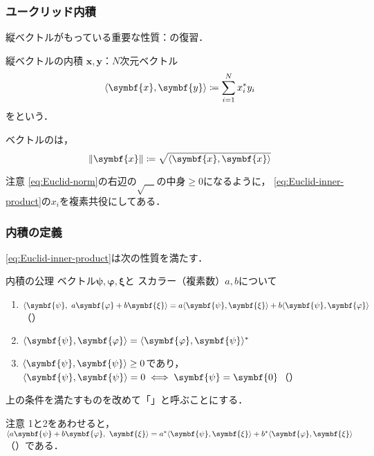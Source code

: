 \documentclass[
    10pt,
    ]{sotsu-beamer}
\begin{document}
\begin{frame}
    \frametitle{ユークリッド内積}

    縦ベクトルがもっている重要な性質：の復習．

    \begin{block}{縦ベクトルの内積}
        $\symbf{x}, \symbf{y}$：$N$次元ベクトル
        \begin{equation}
            \label{eq:Euclid-inner-product}
            \iparen{\symbf{x}, \symbf{y}}
                \coloneq \sum_{i=1}^{N} x_i^* y_i
        \end{equation}
        をという．
    \end{block}

    ベクトルのは，
    \begin{equation}
        \label{eq:Euclid-norm}
        \norm{\symbf{x}} \coloneq \sqrt{\iparen{\symbf{x}, \symbf{x}}}
    \end{equation}

    \begin{alertblock}{注意}
        \eqref{eq:Euclid-norm}の右辺の$\sqrt{\quad}$の中身$\geq 0$になるように，
        \eqref{eq:Euclid-inner-product}の$x_i$を複素共役にしてある．
    \end{alertblock}

\end{frame}

\begin{frame}
    \frametitle{内積の定義}

    \eqref{eq:Euclid-inner-product}は次の性質を満たす．

    \begin{block}{内積の公理}
        ベクトル$\symbf{\psi}, \symbf{\varphi}, \symbf{\xi}$と
        スカラー（複素数）$a, b$について
        \begin{enumerate}
            \item $\iparen{\symbf{\psi}, \  a\symbf{\varphi} + b\symbf{\xi}} = a\iparen{\symbf{\psi}, \symbf{\xi}} + b\iparen{\symbf{\psi}, \symbf{\varphi}}$（）
            \item $\iparen{\symbf{\psi}, \symbf{\varphi}} = \conj{\iparen{\symbf{\varphi}, \symbf{\psi}}}$
            \item $\iparen{\symbf{\psi}, \symbf{\psi}} \geq 0$であり，
                $\iparen{\symbf{\psi}, \symbf{\psi}} = 0 \iff \symbf{\psi} = \symbf{0}$（）
        \end{enumerate}
    \end{block}

    上の条件を満たすものを改めて「」と呼ぶことにする．

    \begin{alertblock}{注意}
        1と2をあわせると，
        $\iparen{a\symbf{\psi} + b\symbf{\varphi}, \  \symbf{\xi}} = \conj{a}\iparen{\symbf{\psi}, \symbf{\xi}} + \conj{b}\iparen{\symbf{\varphi}, \symbf{\xi}}$（）である．
    \end{alertblock}


\end{frame}
\end{document}
